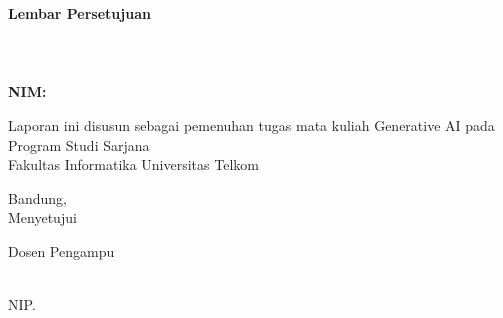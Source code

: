 {\centering
\textbf{\large Lembar Persetujuan}\\
\vspace{0.5cm}
\textbf{\Title}\\
\vspace{0.5cm}
\textbf{\textit{\EngTitle}}\\
\vspace{0.5cm}
\textbf{\Author}\\
\vspace{0.25cm}
\textbf{NIM: \NIM}\\
\vspace{1cm}


{ Laporan ini disusun sebagai pemenuhan tugas mata kuliah Generative AI pada\\ Program Studi Sarjana \Prodi\\ Fakultas Informatika Universitas Telkom}\\

\vspace{0.5cm}

{Bandung, \Tanggal\quad \Bulan \quad \Date}\\
{Menyetujui}\\

\vspace{0.5cm}
\begin{center}
Dosen Pengampu
\end{center}
\begin{center}
\vspace{2cm}
\underline{\PembimbingSatu}\\
NIP. \NIPPembimbingSatu
\end{center}
\vspace{0.5cm}

}

